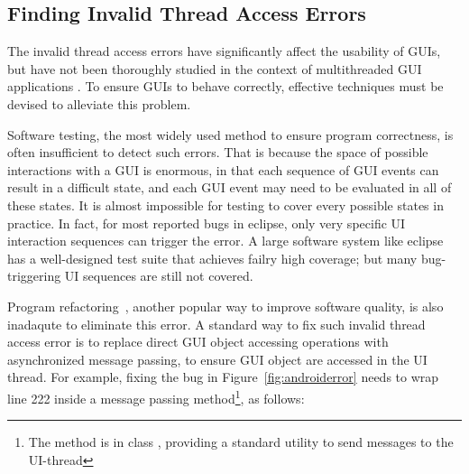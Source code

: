 


\subsection{Finding Invalid Thread Access Errors}

The invalid thread access errors have significantly affect the
usability of GUIs, but have not been thoroughly studied in
the context of multithreaded GUI applications . To ensure GUIs
to behave correctly, effective
techniques must be devised to alleviate this problem.


Software testing, the most widely used method to ensure program correctness,
is often insufficient to detect such errors. That is because the space of possible interactions
with a GUI is enormous, in that each sequence of GUI events can result in
a difficult state, and each GUI event may need to be evaluated in all of
these states. It is almost impossible for testing to cover every possible
states in practice. In fact, for most reported bugs in eclipse, only very specific
UI interaction sequences can trigger the error. A large software system like eclipse
has a well-designed test suite that achieves failry high coverage; but many
 bug-triggering UI sequences are still not covered.

Program refactoring~\cite{Mens:2004}, another popular way to improve software quality,
is also inadaqute to eliminate this error.  A standard way to fix such
invalid thread access error is to replace direct GUI object accessing operations
with asynchronized message passing, to ensure GUI object are accessed in
the UI thread. For example, fixing the bug in Figure~\ref{fig:androiderror}
needs to wrap line 222 inside a  message passing method\footnote{The
 method is in class , providing
a standard utility to send messages to the UI-thread}, as follows:



